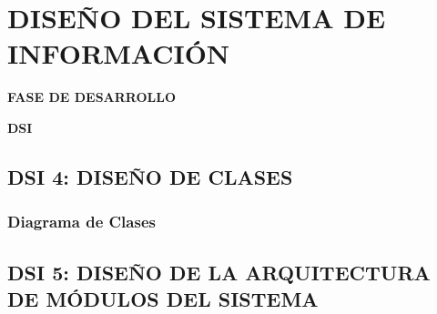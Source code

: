 \newpage
\chapter{DISEÑO DEL SISTEMA DE INFORMACIÓN}
	\vspace{2cm}	
	\begin{center}
	{\Large \textbf{FASE DE DESARROLLO} \par}
	\end{center}
	\vspace{5cm}
	
	\begin{center}
	\Huge \textbf{DSI}\par
	\end{center}


%
%
%
%
% 
%
%


\newpage
\section{DSI 4: DISEÑO DE CLASES}

\subsection{Diagrama de Clases}


\newpage
\section{DSI 5: DISEÑO DE LA ARQUITECTURA DE MÓDULOS DEL SISTEMA}

